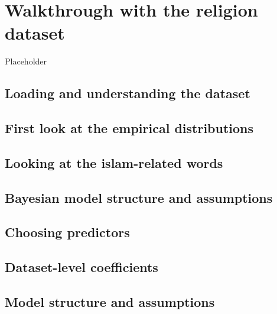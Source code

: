 \documentclass[
  12pt,
]{book}
\begin{document}
\hypertarget{walkthrough-with-the-religion-dataset}{%
\chapter{Walkthrough with the religion dataset}\label{walkthrough-with-the-religion-dataset}}

Placeholder

\hypertarget{loading-and-understanding-the-dataset}{%
\section{Loading and understanding the dataset}\label{loading-and-understanding-the-dataset}}

\hypertarget{first-look-at-the-empirical-distributions}{%
\section{First look at the empirical distributions}\label{first-look-at-the-empirical-distributions}}

\hypertarget{looking-at-the-islam-related-words}{%
\section{Looking at the islam-related words}\label{looking-at-the-islam-related-words}}

\hypertarget{bayesian-model-structure-and-assumptions}{%
\section{Bayesian model structure and assumptions}\label{bayesian-model-structure-and-assumptions}}

\hypertarget{choosing-predictors}{%
\section{Choosing predictors}\label{choosing-predictors}}

\hypertarget{dataset-level-coefficients}{%
\section{Dataset-level coefficients}\label{dataset-level-coefficients}}

\hypertarget{model-structure-and-assumptions}{%
\section{Model structure and assumptions}\label{model-structure-and-assumptions}}
\end{document}
